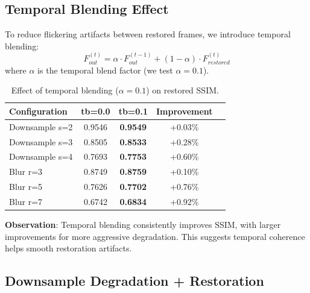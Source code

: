 \documentclass[11pt,a4paper]{article}
\begin{document}
\subsection{Temporal Blending Effect}

To reduce flickering artifacts between restored frames, we introduce temporal blending:
\begin{equation}
    F^{(t)}_{out} = \alpha \cdot F^{(t-1)}_{out} + (1-\alpha) \cdot F^{(t)}_{restored}
\end{equation}
where $\alpha$ is the temporal blend factor (we test $\alpha=0.1$).

\begin{table}[h]
\centering
\begin{tabular}{lcccc}
\toprule
\textbf{Configuration} & \textbf{tb=0.0} & \textbf{tb=0.1} & \textbf{Improvement} \\
\midrule
Downsample s=2 & 0.9546 & \textbf{0.9549} & +0.03\% \\
Downsample s=3 & 0.8505 & \textbf{0.8533} & +0.28\% \\
Downsample s=4 & 0.7693 & \textbf{0.7753} & +0.60\% \\
Blur r=3 & 0.8749 & \textbf{0.8759} & +0.10\% \\
Blur r=5 & 0.7626 & \textbf{0.7702} & +0.76\% \\
Blur r=7 & 0.6742 & \textbf{0.6834} & +0.92\% \\
\bottomrule
\end{tabular}
\caption{Effect of temporal blending ($\alpha=0.1$) on restored SSIM.}
\label{tab:temporal}
\end{table}

\textbf{Observation}: Temporal blending consistently improves SSIM, with larger improvements for more aggressive degradation. This suggests temporal coherence helps smooth restoration artifacts.

\subsection{Downsample Degradation + Restoration}
\end{document}
